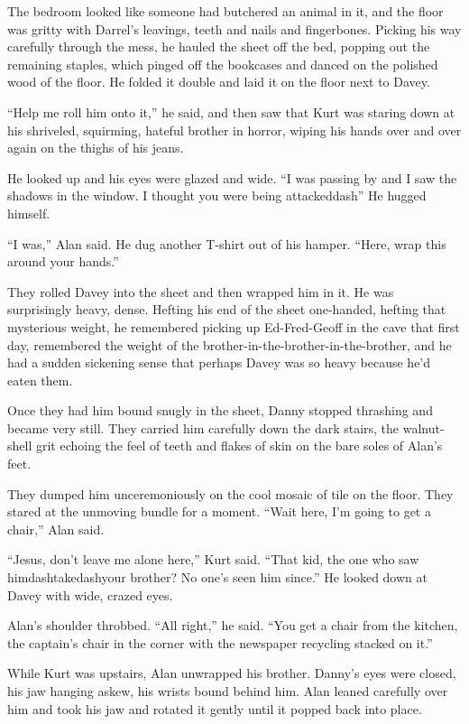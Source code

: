 The bedroom looked like someone had butchered an animal in it, and the
floor was gritty with Darrel's leavings, teeth and nails and
fingerbones.  Picking his way carefully through the mess, he hauled
the sheet off the bed, popping out the remaining staples, which pinged
off the bookcases and danced on the polished wood of the floor.  He
folded it double and laid it on the floor next to Davey.

``Help me roll him onto it,'' he said, and then saw that Kurt was
staring down at his shriveled, squirming, hateful brother in horror,
wiping his hands over and over again on the thighs of his jeans.

He looked up and his eyes were glazed and wide.  ``I was passing by
and I saw the shadows in the window.  I thought you were being
attackeddash{}'' He hugged himself.

``I was,'' Alan said.  He dug another T-shirt out of his hamper. 
``Here, wrap this around your hands.''

They rolled Davey into the sheet and then wrapped him in it.  He was
surprisingly heavy, dense.  Hefting his end of the sheet one-handed,
hefting that mysterious weight, he remembered picking up Ed-Fred-Geoff
in the cave that first day, remembered the weight of the
brother-in-the-brother-in-the-brother, and he had a sudden sickening
sense that perhaps Davey was so heavy because he'd eaten them.

Once they had him bound snugly in the sheet, Danny stopped thrashing
and became very still.  They carried him carefully down the dark
stairs, the walnut-shell grit echoing the feel of teeth and flakes of
skin on the bare soles of Alan's feet.

They dumped him unceremoniously on the cool mosaic of tile on the
floor.  They stared at the unmoving bundle for a moment.  ``Wait here,
I'm going to get a chair,'' Alan said.

``Jesus, don't leave me alone here,'' Kurt said.  ``That kid, the one
who saw himdash{}takedash{}your brother?  No one's seen him since.'' He
looked down at Davey with wide, crazed eyes.

Alan's shoulder throbbed.  ``All right,'' he said.  ``You get a chair
from the kitchen, the captain's chair in the corner with the newspaper
recycling stacked on it.''

While Kurt was upstairs, Alan unwrapped his brother.  Danny's eyes
were closed, his jaw hanging askew, his wrists bound behind him.  Alan
leaned carefully over him and took his jaw and rotated it gently until
it popped back into place.

